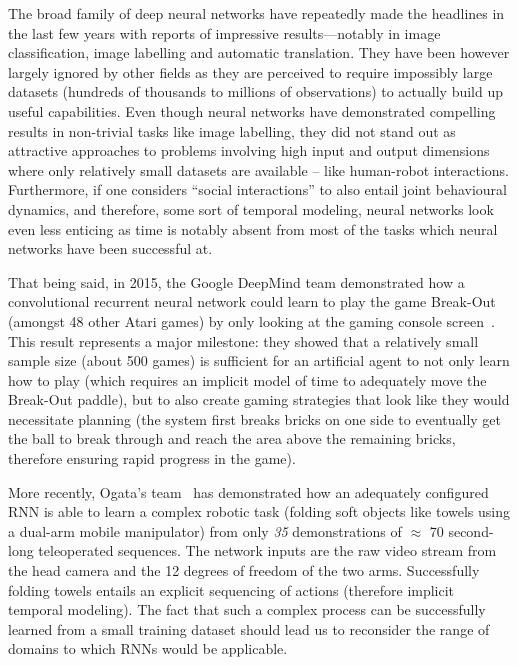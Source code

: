 \documentclass{article}
\begin{document}
The broad family of deep neural networks have repeatedly made the
headlines in the last few years with reports of impressive results---notably in image
classification, image labelling and automatic translation. They have been
however largely ignored by other fields as they are perceived to require
impossibly large datasets (hundreds of thousands to millions of observations) to
actually build up useful capabilities.  Even though neural networks have
demonstrated compelling results in non-trivial tasks like image
labelling, they did not stand out as attractive approaches to problems involving
high input and output dimensions where only relatively small datasets are available -- like human-robot
interactions.  Furthermore, if one considers ``social interactions'' to also
entail joint behavioural dynamics, and therefore, some sort of temporal
modeling, neural networks look even less enticing as time is notably absent from
most of the tasks which neural networks have been successful at.

That being said, in 2015, the Google DeepMind team demonstrated how a convolutional
recurrent neural network could learn to play the game Break-Out (amongst
48 other Atari games) by only looking at the gaming console
screen~\cite{mnih2015human}. This result represents a major milestone: they showed
that a relatively small sample size (about 500 games) is sufficient for an 
artificial agent to not only learn how to play (which requires an implicit model 
of time to adequately move the Break-Out paddle), but to also create gaming 
strategies that look like they would necessitate planning (the system first
breaks bricks on one side to eventually get the ball to break through and reach the area
above the remaining bricks, therefore ensuring rapid progress in the
game).

More recently, Ogata's team~\cite{yang2017repeatable} has demonstrated how an
adequately configured RNN is able to learn a complex robotic task (folding soft
objects like towels using a dual-arm mobile manipulator) from only \emph{35}
demonstrations of $\approx$ 70 second-long teleoperated
sequences. The network inputs are the raw video stream from the head camera and the
12 degrees of freedom of the two arms. Successfully folding towels entails an explicit sequencing of
actions (therefore implicit temporal modeling). The fact that such a complex
process can be successfully learned from a small training dataset should lead
us to reconsider the range of domains to which RNNs would be applicable.
\end{document}
